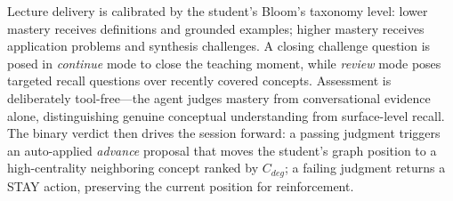 Lecture delivery is calibrated by the student's Bloom's taxonomy level: lower mastery receives definitions and grounded examples; higher mastery receives application problems and synthesis challenges. A closing challenge question is posed in \textit{continue} mode to close the teaching moment, while \textit{review} mode poses targeted recall questions over recently covered concepts. Assessment is deliberately tool-free---the agent judges mastery from conversational evidence alone, distinguishing genuine conceptual understanding from surface-level recall. The binary verdict then drives the session forward: a passing judgment triggers an auto-applied \textit{advance} proposal that moves the student's graph position to a high-centrality neighboring concept ranked by $C_{deg}$; a failing judgment returns a STAY action, preserving the current position for reinforcement.
